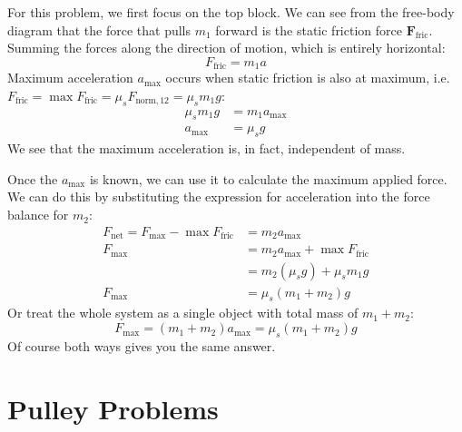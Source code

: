 For this problem, we first focus on the top block. We can see from the
free-body diagram that the force that pulls $m_1$ forward is the static
friction force $\bm F_\text{fric}$.
Summing the forces along the direction of motion, which is entirely horizontal:
\begin{equation*}
  F_\text{fric} = m_1a
\end{equation*}
Maximum acceleration $a_\text{max}$ occurs when static friction is also at
maximum, i.e.\ $F_\text{fric}=\max F_\text{fric}=\mu_sF_{\text{norm},12}=\mu_s m_1g$:
\begin{align*}
  \mu_s m_1g &= m_1a_\text{max}\\
  a_\text{max} &=\mu_s g
\end{align*}
We see that the maximum acceleration is, in fact, independent of mass.

Once the $a_\text{max}$ is known, we can use it to calculate the maximum applied
force. We can do this by substituting the expression for acceleration into the
force balance for $m_2$:
\begin{align*}
  F_\text{net}=F_\text{max}-\max F_\text{fric} &= m_2a_\text{max}\\
  F_\text{max} &= m_2a_\text{max}+\max F_\text{fric}\\
  &= m_2(\mu_sg)+\mu_s m_1g\\
  F_\text{max} &=\mu_s(m_1+m_2)g
\end{align*}
Or treat the whole system as a single object with total mass of $m_1+m_2$:
\begin{equation*}
  F_\text{max} = (m_1+m_2)a_\text{max}= \mu_s(m_1+m_2)g
\end{equation*}
Of course both ways gives you the same answer.



\section{Pulley Problems}


